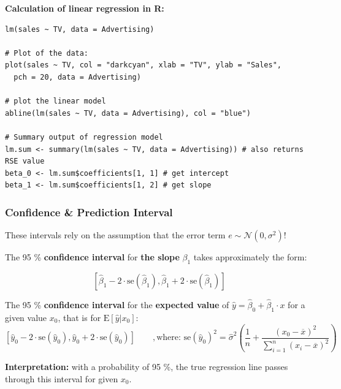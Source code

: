 \documentclass[11pt]{article}
\newcommand*\samplemean[1]{\overline{#1}}
\newcommand*\N[1]{\mathcal{N}\left(#1\right)}
\begin{document}
\noindent
\textbf{Calculation of linear regression in R:}
\begin{verbatim}
lm(sales ~ TV, data = Advertising)

# Plot of the data:
plot(sales ~ TV, col = "darkcyan", xlab = "TV", ylab = "Sales",
  pch = 20, data = Advertising)

# plot the linear model
abline(lm(sales ~ TV, data = Advertising), col = "blue")

# Summary output of regression model
lm.sum <- summary(lm(sales ~ TV, data = Advertising)) # also returns RSE value
beta_0 <- lm.sum$coefficients[1, 1] # get intercept
beta_1 <- lm.sum$coefficients[1, 2] # get slope
\end{verbatim}

\newpage
\subsubsection{Confidence \& Prediction Interval}
These intervals rely on the assumption that the error term $e \sim \N{0, \sigma^2}$!

\begin{definition}
	The 95 \% \textbf{confidence interval} for \textbf{the slope} $\beta_1$ takes approximately the form: 
	
	\begin{equation*}
		\left[ \hat{\beta}_1 - 2\cdot \text{se}(\hat{\beta}_1), \hat{\beta}_1 + 2\cdot \text{se}(\hat{\beta}_1) \right]
	\end{equation*}
	
	\noindent
	The 95 \% \textbf{confidence interval} for the \textbf{expected value} of $\hat{y} = \hat{\beta}_0+\hat{\beta}_1 \cdot x$ for a given value $x_0$, that is for $\text{E}\left[\hat{y} | x_0 \right]$:
	\begin{equation*}
		\left[ \hat{y}_0 - 2\cdot \text{se}(\hat{y}_0), \hat{y}_0 + 2\cdot \text{se}(\hat{y}_0) \right] \qquad, \text{where: } \text{se}(\hat{y}_0)^2 = \hat{\sigma}^2 \left( \frac{1}{n}+ \frac{(x_0-\samplemean{x})^2}{\sum_{i=1}^{n}(x_i-\samplemean{x})^2} \right)
	\end{equation*}
	
	\noindent
	\textbf{Interpretation:} with a probability of 95 \%, the true regression line passes through this interval for given $x_0$.
\end{definition}
\end{document}
